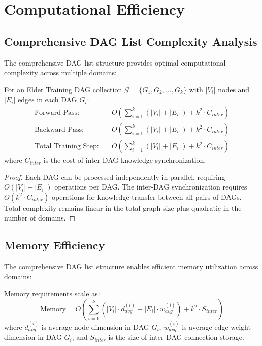 \section{Computational Efficiency}

\subsection{Comprehensive DAG List Complexity Analysis}

The comprehensive DAG list structure provides optimal computational complexity across multiple domains:

\begin{theorem}
For an Elder Training DAG collection $\mathcal{G} = \{G_1, G_2, \ldots, G_k\}$ with $|V_i|$ nodes and $|E_i|$ edges in each DAG $G_i$:
\begin{align}
\text{Forward Pass:} &\quad O\left(\sum_{i=1}^k (|V_i| + |E_i|) + k^2 \cdot C_{inter}\right) \\
\text{Backward Pass:} &\quad O\left(\sum_{i=1}^k (|V_i| + |E_i|) + k^2 \cdot C_{inter}\right) \\
\text{Total Training Step:} &\quad O\left(\sum_{i=1}^k (|V_i| + |E_i|) + k^2 \cdot C_{inter}\right)
\end{align}
where $C_{inter}$ is the cost of inter-DAG knowledge synchronization.
\end{theorem}

\begin{proof}
Each DAG can be processed independently in parallel, requiring $O(|V_i| + |E_i|)$ operations per DAG. The inter-DAG synchronization requires $O(k^2 \cdot C_{inter})$ operations for knowledge transfer between all pairs of DAGs. Total complexity remains linear in the total graph size plus quadratic in the number of domains.
\end{proof}

\subsection{Memory Efficiency}

The comprehensive DAG list structure enables efficient memory utilization across domains:

\begin{lemma}
Memory requirements scale as:
\begin{equation}
\text{Memory} = O\left(\sum_{i=1}^k (|V_i| \cdot d_{avg}^{(i)} + |E_i| \cdot w_{avg}^{(i)}) + k^2 \cdot S_{inter}\right)
\end{equation}
where $d_{avg}^{(i)}$ is average node dimension in DAG $G_i$, $w_{avg}^{(i)}$ is average edge weight dimension in DAG $G_i$, and $S_{inter}$ is the size of inter-DAG connection storage.
\end{lemma}

